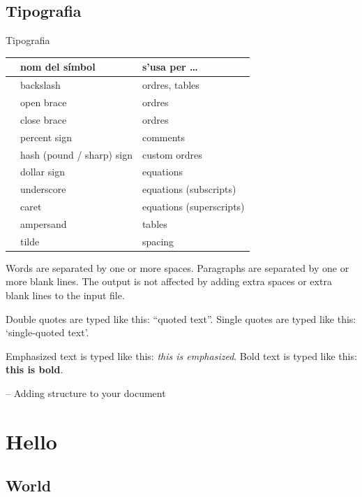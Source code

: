 \subsection{Tipografia}
\begin{frame}{Tipografia}
\begin{tabular}{lll}
& nom del símbol & s'usa per \dots \\\hline
\bftt{\bs} & backslash                 & ordres, tables \\
\bftt{\{}  & open brace                & ordres \\
\bftt{\}}  & close brace               & ordres \\
\bftt{\%}  & percent sign              & comments \\
\bftt{\#}  & hash (pound / sharp) sign & custom ordres \\
\bftt{\$}  & dollar sign               & equations \\
\bftt{\_}  & underscore                & equations (subscripts) \\
\bftt{\^}  & caret                     & equations (superscripts) \\
\bftt{\&}  & ampersand                 & tables \\
\bftt{\~}  & tilde                     & spacing \\
\end{tabular}
\end{frame}


Words are separated by one or more spaces.  Paragraphs are separated by
one or more blank lines.  The output is not affected by adding extra
spaces or extra blank lines to the input file.

Double quotes are typed like this: ``quoted text''.
Single quotes are typed like this: `single-quoted text'.

Emphasized text is typed like this: \emph{this is emphasized}.
Bold       text is typed like this: \textbf{this is bold}.

-- Adding structure to your document

\section{Hello}

\subsection{World}

